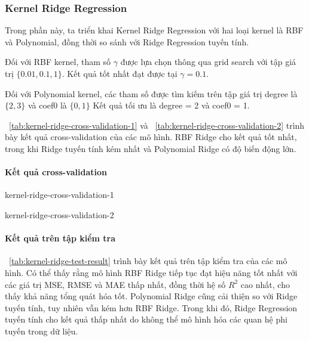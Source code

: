 \subsubsection{Kernel Ridge Regression}

Trong phần này, ta triển khai Kernel Ridge Regression với hai loại kernel là
RBF và Polynomial, đồng thời so sánh với Ridge Regression tuyến tính.

Đối với RBF kernel, tham số $\gamma$ được lựa chọn thông qua grid search với
tập giá trị $\{0.01, 0.1, 1\}$. Kết quả tốt nhất đạt được tại $\gamma = 0.1$.

Đối với Polynomial kernel, các tham số được tìm kiếm trên tập giá trị degree
là $\{2, 3\}$ và coef0 là $\{0, 1\}$ Kết quả tối ưu là degree = 2 và coef0
= 1.

\tablename~\ref{tab:kernel-ridge-cross-validation-1} và
\tablename~\ref{tab:kernel-ridge-cross-validation-2} trình bày kết quả
cross-validation của các mô hình. RBF Ridge cho kết quả tốt nhất, trong khi
Ridge tuyến tính kém nhất và Polynomial Ridge có độ biến động lớn.

\paragraph{Kết quả cross-validation}

\begin{table}[htbp]
  \caption{Kết quả cross-validation của các mô hình (phần 1)}
  \label{tab:kernel-ridge-cross-validation-1}
  \centering
  {kernel-ridge-cross-validation-1}
\end{table}

\begin{table}[htbp]
  \caption{Kết quả cross-validation của các mô hình (phần 2)}
  \label{tab:kernel-ridge-cross-validation-2}
  \centering
  {kernel-ridge-cross-validation-2}
\end{table}

\paragraph{Kết quả trên tập kiểm tra}
\tablename~\ref{tab:kernel-ridge-test-result} trình bày kết quả trên tập kiểm
tra của các mô hình. Có thể thấy rằng mô hình RBF Ridge tiếp tục đạt hiệu năng
tốt nhất với các giá trị MSE, RMSE và MAE thấp nhất, đồng thời hệ số $R^2$ cao
nhất, cho thấy khả năng tổng quát hóa tốt. Polynomial Ridge cũng cải thiện so
với Ridge tuyến tính, tuy nhiên vẫn kém hơn RBF Ridge. Trong khi đó, Ridge
Regression tuyến tính cho kết quả thấp nhất do không thể mô hình hóa các quan
hệ phi tuyến trong dữ liệu.

